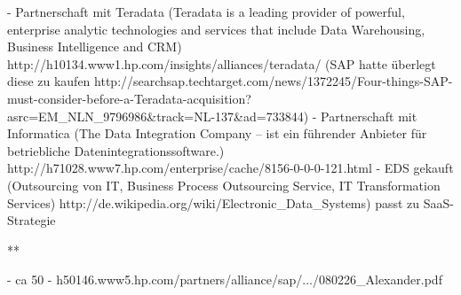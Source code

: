 \documentclass[a4paper,10pt]{article}
\begin{document}
- Partnerschaft mit Teradata (Teradata is a leading provider of powerful, enterprise analytic technologies and services that include Data Warehousing, Business Intelligence and CRM) http://h10134.www1.hp.com/insights/alliances/teradata/ (SAP hatte überlegt diese zu kaufen http://searchsap.techtarget.com/news/1372245/Four-things-SAP-must-consider-before-a-Teradata-acquisition?asrc=EM_NLN_9796986&track=NL-137&ad=733844)
- Partnerschaft mit Informatica (The Data Integration Company – ist ein führender Anbieter für betriebliche Datenintegrationssoftware.) http://h71028.www7.hp.com/enterprise/cache/8156-0-0-0-121.html
- EDS gekauft (Outsourcing von IT, Business Process Outsourcing Service, IT Transformation Services) http://de.wikipedia.org/wiki/Electronic_Data_Systems) passt zu SaaS-Strategie

**

- ca 50%
- h50146.www5.hp.com/partners/alliance/sap/.../080226_Alexander.pdf
\end{document}
